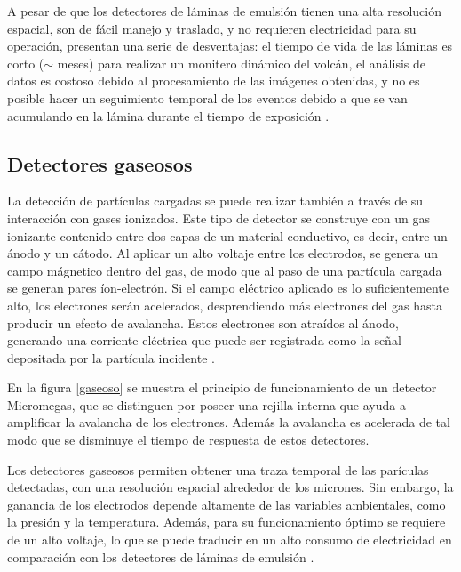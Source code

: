 \documentclass[12pt,oneside,openany,letter]{book}
\begin{document}
A pesar de que los detectores de l\'aminas de emulsi\'on tienen una alta resoluci\'on espacial, son de f\'acil manejo y traslado, y no requieren electricidad para su operaci\'on, presentan una serie de desventajas: el tiempo de vida de las l\'aminas es corto ($\sim$ meses) para realizar un monitero din\'amico del volc\'an, el an\'alisis de datos es costoso debido al procesamiento de las im\'agenes obtenidas, y no es posible hacer un seguimiento temporal de los eventos debido a que se van acumulando en la l\'amina durante el tiempo de exposici\'on \cite{PenaJesus2018}.

\subsection{Detectores gaseosos}
La detecci\'on de part\'iculas cargadas se puede realizar tambi\'en a trav\'es de su interacci\'on con gases ionizados. Este tipo de detector se construye con un gas ionizante contenido entre dos capas de un material conductivo, es decir, entre un \'anodo y un c\'atodo. Al aplicar un alto voltaje entre los electrodos, se genera un campo m\'agnetico dentro del gas, de modo que al paso de una part\'icula cargada se generan pares \'ion-electr\'on. Si el campo el\'ectrico aplicado es lo suficientemente alto, los electrones ser\'an acelerados, desprendiendo m\'as electrones del gas hasta producir un efecto de avalancha. Estos electrones son atra\'idos al \'anodo, generando una corriente el\'ectrica que puede ser registrada como la se\~nal depositada por la part\'icula incidente \cite{PenaJesus2018}. 

En la figura \ref{gaseoso} se muestra el principio de funcionamiento de un detector Micromegas, que se distinguen por poseer una rejilla interna que ayuda a amplificar la avalancha de los electrones. Adem\'as la avalancha es acelerada de tal modo que se disminuye el tiempo de respuesta de estos detectores. 

Los detectores gaseosos permiten obtener una traza temporal de las par\'iculas detectadas, con una resoluci\'on espacial alrededor de los micrones. Sin embargo, la ganancia de los electrodos depende altamente de las variables ambientales, como la presi\'on y la temperatura. Adem\'as, para su funcionamiento \'optimo se requiere de un alto voltaje, lo que se puede traducir en un alto consumo de electricidad en comparaci\'on con los detectores de l\'aminas de emulsi\'on \cite{PenaJesus2018}. 
\end{document}
